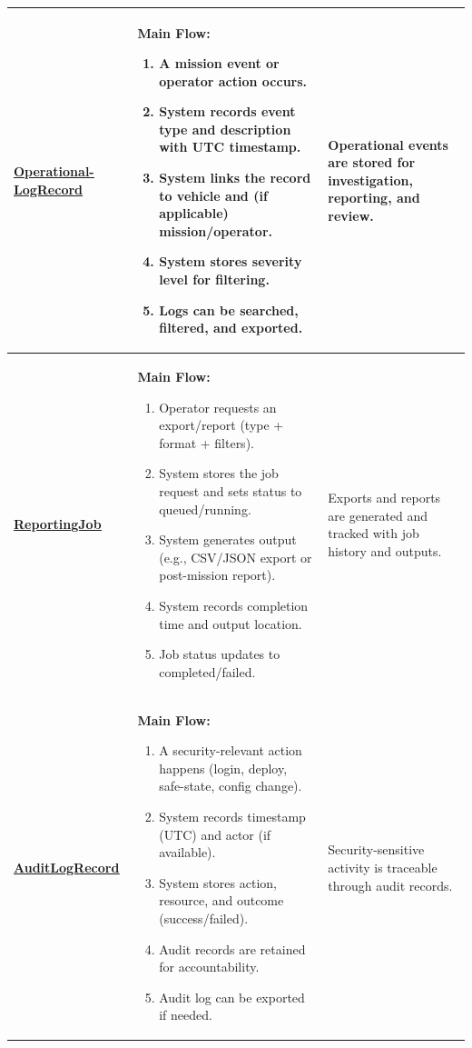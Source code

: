 \documentclass[11pt,a4paper]{article}
\let\orighyperref\hyperref
\renewcommand{\hyperref}[2][]{\orighyperref[#1]{\uline{#2}}}%
\begin{document}
\begin{longtable}{|>{\raggedright\arraybackslash}p{}|>{\raggedright\arraybackslash}p{}|>{\raggedright\arraybackslash}p{}|}
\textbf{\hyperref[tab:data-dictionary-operationallogrecord]{Operational-\allowbreak LogRecord}}\label{flow-OperationalLogRecord} &
\textbf{Main Flow:}\begin{enumerate}[leftmargin=*,nosep]
  \item A mission event or operator action occurs.
  \item System records event type and description with UTC timestamp.
  \item System links the record to vehicle and (if applicable) mission/operator.
  \item System stores severity level for filtering.
  \item Logs can be searched, filtered, and exported.
\end{enumerate} &
Operational events are stored for investigation, reporting, and review. \\
\hline

\textbf{\hyperref[tab:data-dictionary-reportingjob]{ReportingJob}}\label{flow-ReportingJob} &
\textbf{Main Flow:}\begin{enumerate}[leftmargin=*,nosep]
  \item Operator requests an export/report (type + format + filters).
  \item System stores the job request and sets status to queued/running.
  \item System generates output (e.g., CSV/JSON export or post-mission report).
  \item System records completion time and output location.
  \item Job status updates to completed/failed.
\end{enumerate} &
Exports and reports are generated and tracked with job history and outputs. \\
\hline

\textbf{\hyperref[tab:data-dictionary-auditlogrecord]{AuditLogRecord}}\label{flow-AuditLogRecord} &
\textbf{Main Flow:}\begin{enumerate}[leftmargin=*,nosep]
  \item A security-relevant action happens (login, deploy, safe-state, config change).
  \item System records timestamp (UTC) and actor (if available).
  \item System stores action, resource, and outcome (success/failed).
  \item Audit records are retained for accountability.
  \item Audit log can be exported if needed.
\end{enumerate} &
Security-sensitive activity is traceable through audit records. \\
\hline


\end{longtable}
\end{document}
